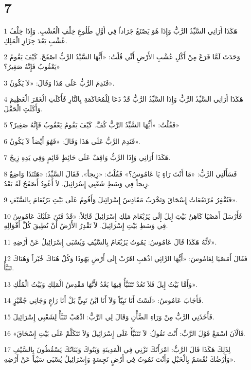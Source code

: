 \chapter{7}

\par 1 هَكَذَا أَرَانِي السَّيِّدُ الرَّبُّ وَإِذَا هُوَ يَصْنَعُ جَرَاداً فِي أَوَّلِ طُلُوعِ خِلْفِ الْعُشْبِ. وَإِذَا خِلْفُ عُشْبٍ بَعْدَ جِزَازِ الْمَلِكِ.
\par 2 وَحَدَثَ لَمَّا فَرَغَ مِنْ أَكْلِ عُشْبِ الأَرْضِ أَنِّي قُلْتُ: «أَيُّهَا السَّيِّدُ الرَّبُّ اصْفَحْ. كَيْفَ يَقُومُ يَعْقُوبُ فَإِنَّهُ صَغِيرٌ؟»
\par 3 فَنَدِمَ الرَّبُّ عَلَى هَذَا وَقَالَ: «لاَ يَكُونُ».
\par 4 هَكَذَا أَرَانِي السَّيِّدُ الرَّبُّ وَإِذَا السَّيِّدُ الرَّبُّ قَدْ دَعَا لِلْمُحَاكَمَةِ بِالنَّارِ فَأَكَلَتِ الْغَمْرَ الْعَظِيمَ وَأَكَلَتِ الْحَقْلَ.
\par 5 فَقُلْتُ: «أَيُّهَا السَّيِّدُ الرَّبُّ كُفَّ. كَيْفَ يَقُومُ يَعْقُوبُ فَإِنَّهُ صَغِيرٌ؟»
\par 6 فَنَدِمَ الرَّبُّ عَلَى هَذَا وَقَالَ: «فَهُوَ أَيْضاً لاَ يَكُونُ».
\par 7 هَكَذَا أَرَانِي وَإِذَا الرَّبُّ وَاقِفٌ عَلَى حَائِطٍ قَائِمٍ وَفِي يَدِهِ زِيجٌ.
\par 8 فَسَأَلَنِي الرَّبُّ: «مَا أَنْتَ رَاءٍ يَا عَامُوسُ؟» فَقُلْتُ: «زِيجاً». فَقَالَ السَّيِّدُ: «هَئَنَذَا وَاضِعٌ زِيجاً فِي وَسَطِ شَعْبِي إِسْرَائِيلَ. لاَ أَعُودُ أَصْفَحُ لَهُ بَعْدُ.
\par 9 فَتُقْفِرُ مُرْتَفَعَاتُ إِسْحَاقَ وَتَخْرَبُ مَقَادِسُ إِسْرَائِيلَ وَأَقُومُ عَلَى بَيْتِ يَرُبْعَامَ بِالسَّيْفِ».
\par 10 فَأَرْسَلَ أَمَصْيَا كَاهِنُ بَيْتَِ إِيلَ إِلَى يَرُبْعَامَ مَلِكِ إِسْرَائِيلَ قَائِلاً: «قَدْ فَتَنَ عَلَيْكَ عَامُوسُ فِي وَسَطِ بَيْتِ إِسْرَائِيلَ. لاَ تَقْدِرُ الأَرْضُ أَنْ تُطِيقَ كُلَّ أَقْوَالِهِ.
\par 11 لأَنَّهُ هَكَذَا قَالَ عَامُوسُ: يَمُوتُ يَرُبْعَامُ بِالسَّيْفِ وَيُسْبَى إِسْرَائِيلُ عَنْ أَرْضِهِ».
\par 12 فَقَالَ أَمَصْيَا لِعَامُوسَ: «أَيُّهَا الرَّائِي اذْهَبِ اهْرُبْ إِلَى أَرْضِ يَهُوذَا وَكُلْ هُنَاكَ خُبْزاً وَهُنَاكَ تَنَبَّأْ.
\par 13 وَأَمَّا بَيْتُ إِيلَ فَلاَ تَعُدْ تَتَنَبَّأُ فِيهَا بَعْدُ لأَنَّهَا مَقْدِسُ الْمَلِكِ وَبَيْتُ الْمُلْكِ».
\par 14 فَأَجَابَ عَامُوسُ: «لَسْتُ أَنَا نَبِيّاً وَلاَ أَنَا ابْنُ نَبِيٍّ بَلْ أَنَا رَاعٍ وَجَانِي جُمَّيْزٍ.
\par 15 فَأَخَذَنِي الرَّبُّ مِنْ وَرَاءِ الضَّأْنِ وَقَالَ لِي الرَّبُّ: اذْهَبْ تَنَبَّأْ لِشَعْبِي إِسْرَائِيلَ.
\par 16 «فَالْآنَ اسْمَعْ قَوْلَ الرَّبِّ: أَنْتَ تَقُولُ: لاَ تَتَنَبَّأْ عَلَى إِسْرَائِيلَ وَلاَ تَتَكَلَّمْ عَلَى بَيْتِ إِسْحَاقَ.
\par 17 لِذَلِكَ هَكَذَا قَالَ الرَّبُّ: امْرَأَتُكَ تَزْنِي فِي الْمَدِينَةِ وَبَنُوكَ وَبَنَاتُكَ يَسْقُطُونَ بِالسَّيْفِ وَأَرْضُكَ تُقْسَمُ بِالْحَبْلِ وَأَنْتَ تَمُوتُ فِي أَرْضٍ نَجِسَةٍ وَإِسْرَائِيلُ يُسْبَى سَبْياً عَنْ أَرْضِهِ».


